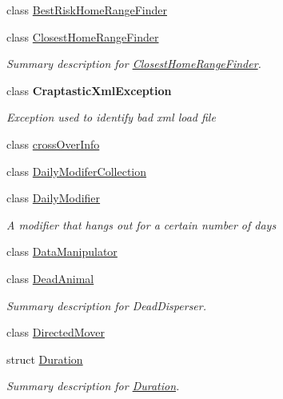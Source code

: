 \begin{DoxyCompactItemize}
class \hyperlink{class_p_a_z___dispersal_1_1_best_risk_home_range_finder}{Best\-Risk\-Home\-Range\-Finder}
\begin{DoxyCompactList}\small\item\em \end{DoxyCompactList}\item 
class \hyperlink{class_p_a_z___dispersal_1_1_closest_home_range_finder}{Closest\-Home\-Range\-Finder}
\begin{DoxyCompactList}\small\item\em Summary description for \hyperlink{class_p_a_z___dispersal_1_1_closest_home_range_finder}{Closest\-Home\-Range\-Finder}. \end{DoxyCompactList}\item 
class {\bfseries Craptastic\-Xml\-Exception}
\begin{DoxyCompactList}\small\item\em Exception used to identify bad xml load file \end{DoxyCompactList}\item 
class \hyperlink{class_p_a_z___dispersal_1_1cross_over_info}{cross\-Over\-Info}
\item 
class \hyperlink{class_p_a_z___dispersal_1_1_daily_modifer_collection}{Daily\-Modifer\-Collection}
\item 
class \hyperlink{class_p_a_z___dispersal_1_1_daily_modifier}{Daily\-Modifier}
\begin{DoxyCompactList}\small\item\em A modifier that hangs out for a certain number of days \end{DoxyCompactList}\item 
class \hyperlink{class_p_a_z___dispersal_1_1_data_manipulator}{Data\-Manipulator}
\item 
class \hyperlink{class_p_a_z___dispersal_1_1_dead_animal}{Dead\-Animal}
\begin{DoxyCompactList}\small\item\em Summary description for Dead\-Disperser. \end{DoxyCompactList}\item 
class \hyperlink{class_p_a_z___dispersal_1_1_directed_mover}{Directed\-Mover}
\begin{DoxyCompactList}\small\item\em \end{DoxyCompactList}\item 
struct \hyperlink{struct_p_a_z___dispersal_1_1_duration}{Duration}
\begin{DoxyCompactList}\small\item\em Summary description for \hyperlink{struct_p_a_z___dispersal_1_1_duration}{Duration}. \end{DoxyCompactList}\item 

\end{DoxyCompactItemize}
